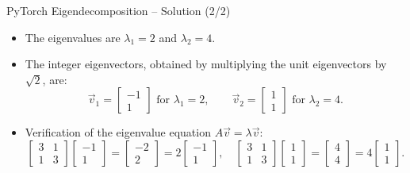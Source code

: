 \documentclass{beamer}
\begin{document}
\begin{frame}{PyTorch Eigendecomposition -- Solution (2/2)}
  \begin{itemize}
    \item The eigenvalues are \(\lambda_1 = 2\) and \(\lambda_2 = 4\).
    \item The integer eigenvectors, obtained by multiplying the unit eigenvectors by \(\sqrt{2}\), are:
    \begin{equation}
      \vec{v}_1 = \begin{bmatrix} -1 \\ 1 \end{bmatrix} \text{ for } \lambda_1 = 2, \qquad
      \vec{v}_2 = \begin{bmatrix} 1 \\ 1 \end{bmatrix} \text{ for } \lambda_2 = 4.
    \end{equation}
    \item Verification of the eigenvalue equation \(A\vec{v} = \lambda\vec{v}\):
    \begin{equation}
      \begin{bmatrix} 3 & 1 \\ 1 & 3 \end{bmatrix}\begin{bmatrix} -1 \\ 1 \end{bmatrix}
      = \begin{bmatrix} -2 \\ 2 \end{bmatrix} = 2\begin{bmatrix} -1 \\ 1 \end{bmatrix}, \quad
      \begin{bmatrix} 3 & 1 \\ 1 & 3 \end{bmatrix}\begin{bmatrix} 1 \\ 1 \end{bmatrix}
      = \begin{bmatrix} 4 \\ 4 \end{bmatrix} = 4\begin{bmatrix} 1 \\ 1 \end{bmatrix}.
    \end{equation}
  \end{itemize}
\end{frame}
\end{document}
